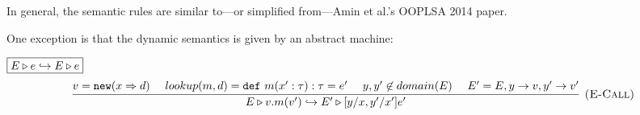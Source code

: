 \documentclass{llncs}
\newcommand{\keywadj}[1]{\mathtt{#1}}
\newcommand{\keyw}[1]{\keywadj{#1}~}
\begin{document}
In general, the semantic rules are similar to---or simplified from---Amin et al.'s
OOPLSA 2014 paper.

One exception is that the dynamic semantics is given by an abstract machine:

$\fbox{$E \triangleright e \hookrightarrow E \triangleright e$}$
\[
\begin{array}{c}
\infer[\textsc{(E-Call)}]
  {E \triangleright v.m(v') \hookrightarrow E' \triangleright [y/x,y'/x']e'}
  {v = \keywadj{new}(x \Rightarrow d) ~~~~
  lookup(m,d) = \keyw{def} m(x':\tau):\tau = e' ~~~~
  y,y' \not\in domain(E) ~~~~
  E' = E, y \rightarrow v, y' \rightarrow v'}%
\end{array}
\]
\end{document}
